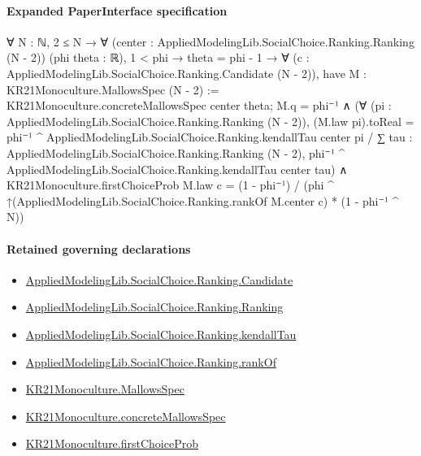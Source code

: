 \documentclass[10pt]{article}
\begin{document}
\paragraph{Expanded PaperInterface specification}
\begin{ReviewVerbatim}
∀ {N : ℕ},
  2 ≤ N →
    ∀ (center : AppliedModelingLib.SocialChoice.Ranking.Ranking (N - 2)) (phi theta : ℝ),
      1 < phi →
        theta = phi - 1 →
          ∀ (c : AppliedModelingLib.SocialChoice.Ranking.Candidate (N - 2)),
            have M : KR21Monoculture.MallowsSpec (N - 2) := KR21Monoculture.concreteMallowsSpec center theta;
            M.q = phi⁻¹ ∧
              (∀ (pi : AppliedModelingLib.SocialChoice.Ranking.Ranking (N - 2)),
                  (M.law pi).toReal =
                    phi⁻¹ ^ AppliedModelingLib.SocialChoice.Ranking.kendallTau center pi /
                      ∑ tau : AppliedModelingLib.SocialChoice.Ranking.Ranking (N - 2),
                        phi⁻¹ ^ AppliedModelingLib.SocialChoice.Ranking.kendallTau center tau) ∧
                KR21Monoculture.firstChoiceProb M.law c =
                  (1 - phi⁻¹) / (phi ^ ↑(AppliedModelingLib.SocialChoice.Ranking.rankOf M.center c) * (1 - phi⁻¹ ^ N))
\end{ReviewVerbatim}

\paragraph{Retained governing declarations}
\begin{itemize}\raggedright
\item \hyperlink{library-prerequisite-8c0e6c25845ae78a}{Applied\allowbreak{}Modeling\allowbreak{}Lib.\allowbreak{}Social\allowbreak{}Choice.\allowbreak{}Ranking.\allowbreak{}Candidate}
\item \hyperlink{library-prerequisite-5cde54446d1ae021}{Applied\allowbreak{}Modeling\allowbreak{}Lib.\allowbreak{}Social\allowbreak{}Choice.\allowbreak{}Ranking.\allowbreak{}Ranking}
\item \hyperlink{governing-declaration-127efd44d176e2ba}{Applied\allowbreak{}Modeling\allowbreak{}Lib.\allowbreak{}Social\allowbreak{}Choice.\allowbreak{}Ranking.\allowbreak{}kendall\allowbreak{}Tau}
\item \hyperlink{governing-declaration-ef804e95c0f14f7c}{Applied\allowbreak{}Modeling\allowbreak{}Lib.\allowbreak{}Social\allowbreak{}Choice.\allowbreak{}Ranking.\allowbreak{}rank\allowbreak{}Of}
\item \hyperlink{governing-declaration-b2e6ec0602659b07}{KR21\allowbreak{}Monoculture.\allowbreak{}Mallows\allowbreak{}Spec}
\item \hyperlink{governing-declaration-0e399c7dd166853c}{KR21\allowbreak{}Monoculture.\allowbreak{}concrete\allowbreak{}Mallows\allowbreak{}Spec}
\item \hyperlink{governing-declaration-93eb0433da315974}{KR21\allowbreak{}Monoculture.\allowbreak{}first\allowbreak{}Choice\allowbreak{}Prob}
\end{itemize}
\end{document}
